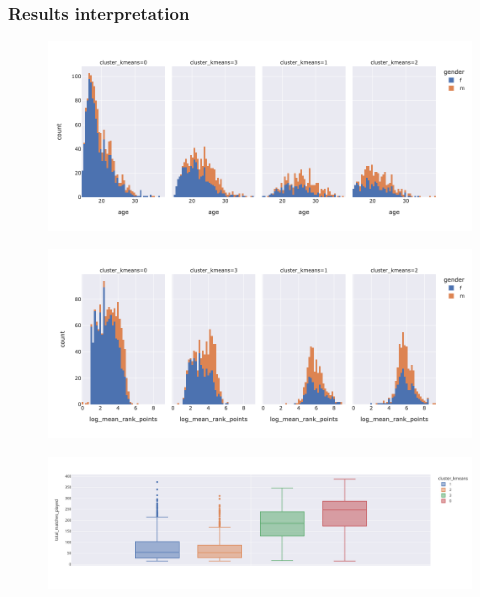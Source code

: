 \subsubsection{Results interpretation}
\begin{figure}[!h]
	\centering
	\begin{minipage}{.45\textwidth}
		\centering
		\includegraphics[width=\textwidth]{plots/kmeans/hist_age.png}
		\label{fig:age_kmeans}
	\end{minipage}%
	\begin{minipage}{.45\textwidth}
		\centering
		\includegraphics[width=\textwidth]{plots/kmeans/hist_log_mean_rank_points.png}
		\label{fig:mean_rank_points_kmeans}
	\end{minipage}
	\begin{minipage}{.45\textwidth}
		\centering
		\includegraphics[width=\textwidth]{plots/kmeans/kmeans-box-plot-matches-played.png}

\end{minipage}
\end{figure}
